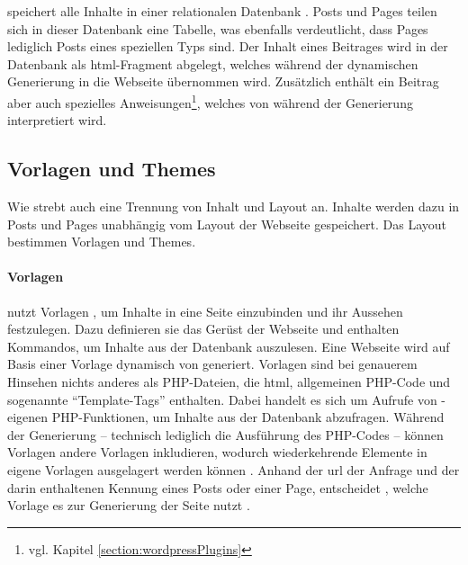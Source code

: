         {\wordpress} speichert alle Inhalte in einer relationalen Datenbank \cite[Kapitel "`Database Description"']{wordpress:codex}.
        Posts und Pages teilen sich in dieser Datenbank eine Tabelle,
        was ebenfalls verdeutlicht, dass Pages lediglich Posts eines speziellen Typs sind.
        Der Inhalt eines Beitrages wird in der Datenbank als \gls{html}-Fragment abgelegt,
        welches während der dynamischen Generierung in die Webseite übernommen wird.
        Zusätzlich enthält ein Beitrag aber auch spezielles Anweisungen\footnote{vgl. Kapitel \ref{section:wordpressPlugins}},
        welches von {\wordpress} während der Generierung interpretiert wird.

    \subsection{Vorlagen und Themes}
        \label{section:wordpressTemplatesThemes}
        Wie {\imperia} strebt auch {\wordpress} eine Trennung von
        Inhalt und Layout an.
        Inhalte werden dazu in
        Posts und Pages
        unabhängig vom Layout der Webseite gespeichert.
        Das Layout bestimmen Vorlagen und Themes.

        \paragraph*{Vorlagen}
        {\wordpress} nutzt Vorlagen \cite[Kapitel "`Templates"']{wordpress:codex}, um Inhalte in eine Seite einzubinden
        und ihr Aussehen festzulegen.
        Dazu definieren sie das Gerüst der Webseite und enthalten Kommandos,
        um Inhalte aus der Datenbank auszulesen.
        Eine Webseite wird auf Basis einer Vorlage dynamisch von {\wordpress} generiert.
        Vorlagen sind bei genauerem Hinsehen nichts anderes als PHP-Dateien,
        die \gls{html}, allgemeinen PHP-Code und sogenannte
        "`Template-Tags"' enthalten.
        Dabei handelt es sich um Aufrufe von
        {\wordpress}-eigenen PHP-Funktionen,
        um Inhalte aus der Datenbank abzufragen.
        Während der Generierung -- technisch lediglich die Ausführung
        des PHP-Codes -- können Vorlagen andere Vorlagen inkludieren,
        wodurch wiederkehrende Elemente in eigene Vorlagen ausgelagert
        werden können \cite[Kapitel "`Template Files"']{wordpress:codex}.
        Anhand der \gls{url} der Anfrage und der darin enthaltenen
        Kennung eines Posts oder einer Page,
        entscheidet {\wordpress}, welche Vorlage es zur Generierung der Seite nutzt
        \cite[Kapitel "`Template Hierarchy"']{wordpress:codex}.

